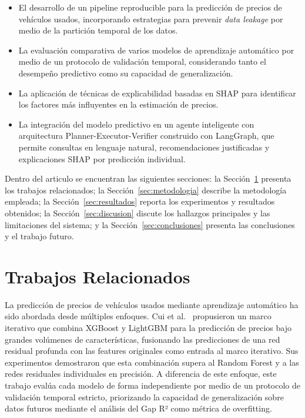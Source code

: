 \documentclass[conference]{IEEEtran}
\begin{document}
\begin{itemize}
\item El desarrollo de un pipeline reproducible para la predicción de precios de vehículos usados, incorporando estrategias para prevenir \textit{data leakage} por medio de la partición temporal de los datos.

\item La evaluación comparativa de varios modelos de aprendizaje automático por medio de un protocolo de validación temporal, considerando tanto el desempeño predictivo como su capacidad de generalización.

\item La aplicación de técnicas de explicabilidad basadas en SHAP para identificar los factores más influyentes en la estimación de precios.

\item La integración del modelo predictivo en un agente inteligente con arquitectura Planner-Executor-Verifier construido con LangGraph, que permite consultas en lenguaje natural, recomendaciones justificadas y explicaciones SHAP por predicción individual.
\end{itemize}

Dentro del articulo se encuentran las siguientes secciones: la Sección~\ref{sec:related} presenta los trabajos relacionados; la Sección~\ref{sec:metodologia} describe la metodología empleada; la Sección~\ref{sec:resultados} reporta los experimentos y resultados obtenidos; la Sección~\ref{sec:discusion} discute los hallazgos principales y las limitaciones del sistema; y la Sección~\ref{sec:conclusiones} presenta las conclusiones y el trabajo futuro.

\section{Trabajos Relacionados}
\label{sec:related}

La predicción de precios de vehículos usados mediante aprendizaje automático ha sido abordada desde múltiples enfoques. Cui et al.~\cite{cui2022} propusieron un marco iterativo que combina XGBoost y LightGBM para la predicción de precios bajo grandes volúmenes de características, fusionando las predicciones de una red residual profunda con las features originales como entrada al marco iterativo. Sus experimentos demostraron que esta combinación supera al Random Forest y a las redes residuales individuales en precisión. A diferencia de este enfoque, este trabajo evalúa cada modelo de forma independiente por medio de un protocolo de validación temporal estricto, priorizando la capacidad de generalización sobre datos futuros mediante el análisis del Gap R² como métrica de overfitting.
\end{document}

